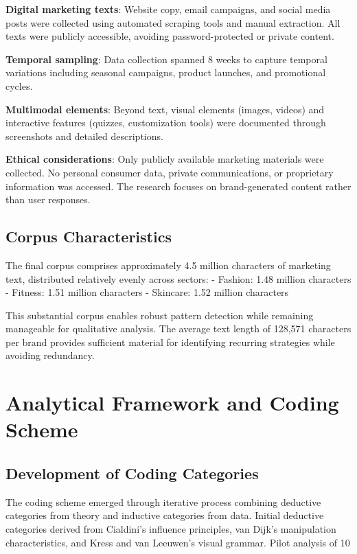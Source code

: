 \textbf{Digital marketing texts}: Website copy, email campaigns, and social media posts were collected using automated scraping tools and manual extraction. All texts were publicly accessible, avoiding password-protected or private content.

\textbf{Temporal sampling}: Data collection spanned 8 weeks to capture temporal variations including seasonal campaigns, product launches, and promotional cycles.

\textbf{Multimodal elements}: Beyond text, visual elements (images, videos) and interactive features (quizzes, customization tools) were documented through screenshots and detailed descriptions.

\textbf{Ethical considerations}: Only publicly available marketing materials were collected. No personal consumer data, private communications, or proprietary information was accessed. The research focuses on brand-generated content rather than user responses.

\subsection{Corpus Characteristics}

The final corpus comprises approximately 4.5 million characters of marketing text, distributed relatively evenly across sectors:
- Fashion: 1.48 million characters
- Fitness: 1.51 million characters  
- Skincare: 1.52 million characters

This substantial corpus enables robust pattern detection while remaining manageable for qualitative analysis. The average text length of 128,571 characters per brand provides sufficient material for identifying recurring strategies while avoiding redundancy.

\section{Analytical Framework and Coding Scheme}
\label{sec:analytical_framework}

\subsection{Development of Coding Categories}

The coding scheme emerged through iterative process combining deductive categories from theory and inductive categories from data. Initial deductive categories derived from Cialdini's influence principles, van Dijk's manipulation characteristics, and Kress and van Leeuwen's visual grammar. Pilot analysis of 10\\%

